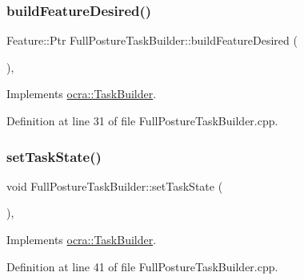 \subsubsection{\texorpdfstring{build\+Feature\+Desired()}{buildFeatureDesired()}}
{\footnotesize\ttfamily Feature\+::\+Ptr Full\+Posture\+Task\+Builder\+::build\+Feature\+Desired (\begin{DoxyParamCaption}{ }\end{DoxyParamCaption})\hspace{0.3cm}{\ttfamily [protected]}, {\ttfamily [virtual]}}



Implements \hyperlink{classocra_1_1TaskBuilder_a7a2c8bcc5d95160d0e48806a2648f1a5}{ocra\+::\+Task\+Builder}.



Definition at line 31 of file Full\+Posture\+Task\+Builder.\+cpp.

\hypertarget{classocra_1_1FullPostureTaskBuilder_a0f3852057b316baa402806fb320d257b}{}\label{classocra_1_1FullPostureTaskBuilder_a0f3852057b316baa402806fb320d257b} 
\subsubsection{\texorpdfstring{set\+Task\+State()}{setTaskState()}}
{\footnotesize\ttfamily void Full\+Posture\+Task\+Builder\+::set\+Task\+State (\begin{DoxyParamCaption}{ }\end{DoxyParamCaption})\hspace{0.3cm}{\ttfamily [protected]}, {\ttfamily [virtual]}}



Implements \hyperlink{classocra_1_1TaskBuilder_a7b44bfa101566ea4400e2d9bfdb9ff32}{ocra\+::\+Task\+Builder}.



Definition at line 41 of file Full\+Posture\+Task\+Builder.\+cpp.

\hypertarget{classocra_1_1FullPostureTaskBuilder_a5bae08175fd730b46004ddfccc9a1d8b}{}\label{classocra_1_1FullPostureTaskBuilder_a5bae08175fd730b46004ddfccc9a1d8b} 
